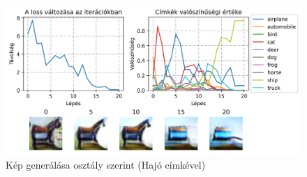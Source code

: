 \begin{figure}[h]
	\centering
	\includegraphics[width=15cm]{images/searching-cifar_ship.png}
	\caption{Kép generálása osztály szerint (Hajó címkével)}
	\label{fig:searching_ship}
\end{figure}


